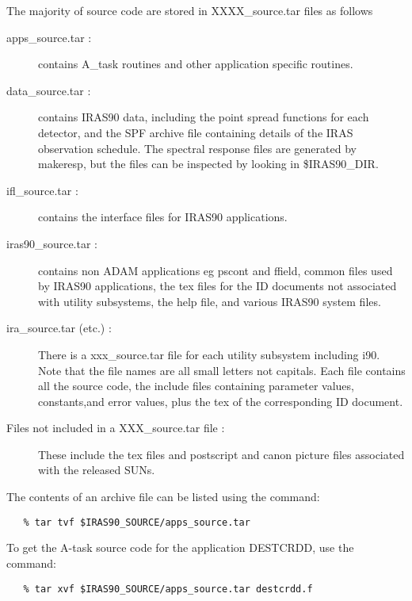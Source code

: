 The majority of source code are stored in XXXX\_source.tar files as follows

\begin{description}

\item [apps\_source.tar :] contains A\_task routines and other application 
specific routines.

\item [data\_source.tar :] contains IRAS90 data, including the point spread 
functions for each detector, and the SPF archive file containing details of
the {\small IRAS} observation schedule. The spectral response files are 
generated by makeresp, but the files can be inspected by looking in 
\$IRAS90\_DIR.

\item [ifl\_source.tar :] contains the interface files for {\small IRAS90}
applications.

\item [iras90\_source.tar :] contains non {\small ADAM} applications eg pscont
and ffield, common files used by {\small IRAS90} applications, the tex files 
for the {\small ID} documents not associated with utility subsystems, the help
file, and various {\small IRAS90} system files.

\item [ira\_source.tar (etc.) :] There is a xxx\_source.tar file for each 
utility subsystem including {\small i90}. Note that the file names are all 
small letters not capitals. Each file contains all the source code, the
include files containing parameter values, constants,and error values, plus the
tex of the corresponding {\small ID} document.

\item [Files not included in a XXX\_source.tar file :] These include the 
tex files and postscript and canon picture files associated with the released 
SUNs.

\end{description}

The contents of an archive file can be listed using the command: 

\small
\begin{verbatim}
   % tar tvf $IRAS90_SOURCE/apps_source.tar
\end{verbatim}
\normalsize

To get the A-task source code for the application {\small DESTCRDD}, use 
the command: 

\small
\begin{verbatim}
   % tar xvf $IRAS90_SOURCE/apps_source.tar destcrdd.f 
\end{verbatim}
\normalsize

